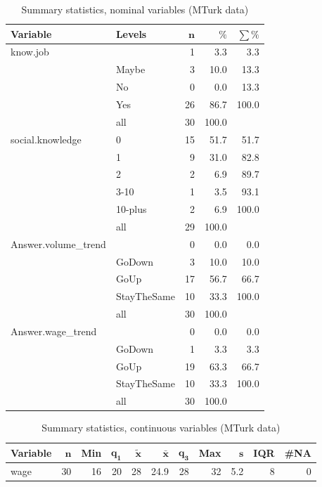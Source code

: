 \documentclass[a4paper,10pt]{article}\usepackage[]{graphicx}\usepackage[]{color}
\begin{document}
\begin{table}[ht]
\centering
{\footnotesize
\begin{tabular}{ll|rrr}
 \textbf{Variable} & \textbf{Levels} & $\mathbf{n}$ & $\mathbf{\%}$ & $\mathbf{\sum \%}$ \\ 
  \hline
know.job &  & 1 & 3.3 & 3.3 \\ 
   & Maybe & 3 & 10.0 & 13.3 \\ 
   & No & 0 & 0.0 & 13.3 \\ 
   & Yes & 26 & 86.7 & 100.0 \\ 
   \hline
 & all & 30 & 100.0 &  \\ 
   \hline
\hline
social.knowledge & 0 & 15 & 51.7 & 51.7 \\ 
   & 1 & 9 & 31.0 & 82.8 \\ 
   & 2 & 2 & 6.9 & 89.7 \\ 
   & 3-10 & 1 & 3.5 & 93.1 \\ 
   & 10-plus & 2 & 6.9 & 100.0 \\ 
   \hline
 & all & 29 & 100.0 &  \\ 
   \hline
\hline
Answer.volume\_trend &  & 0 & 0.0 & 0.0 \\ 
   & GoDown & 3 & 10.0 & 10.0 \\ 
   & GoUp & 17 & 56.7 & 66.7 \\ 
   & StayTheSame & 10 & 33.3 & 100.0 \\ 
   \hline
 & all & 30 & 100.0 &  \\ 
   \hline
\hline
Answer.wage\_trend &  & 0 & 0.0 & 0.0 \\ 
   & GoDown & 1 & 3.3 & 3.3 \\ 
   & GoUp & 19 & 63.3 & 66.7 \\ 
   & StayTheSame & 10 & 33.3 & 100.0 \\ 
   \hline
 & all & 30 & 100.0 &  \\ 
   \hline
\hline
\end{tabular}
}
\caption{Summary statistics, nominal variables (MTurk data)} 
\label{tab1:13-2010}
\end{table}
\begin{table}[ht]
\centering
{\footnotesize
\begin{tabular}{lrrrrrrrrrr}
 \textbf{Variable} & $\mathbf{n}$ & \textbf{Min} & $\mathbf{q_1}$ & $\mathbf{\widetilde{x}}$ & $\mathbf{\bar{x}}$ & $\mathbf{q_3}$ & \textbf{Max} & $\mathbf{s}$ & \textbf{IQR} & \textbf{\#NA} \\ 
  \hline
wage & 30 & 16 & 20 & 28 & 24.9 & 28 & 32 & 5.2 & 8 & 0 \\ 
  \end{tabular}
}
\caption{Summary statistics, continuous variables (MTurk data)} 
\label{tab2:13-2010}
\end{table}
\end{document}

